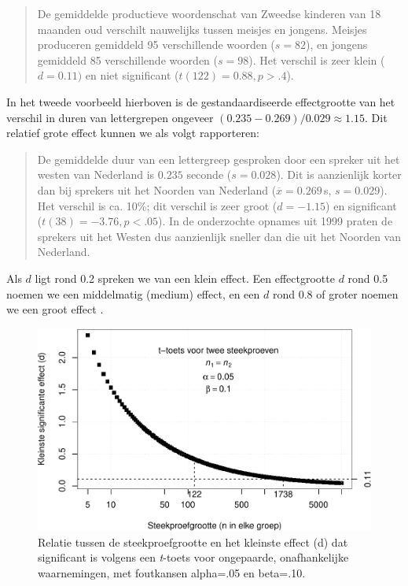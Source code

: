 \documentclass[
]{book}
\begin{document}
\begin{quote}
De gemiddelde productieve woordenschat van Zweedse kinderen van 18
maanden oud verschilt nauwelijks tussen meisjes en jongens. Meisjes
produceren gemiddeld 95 verschillende woorden (\(s=82\)), en jongens
gemiddeld 85 verschillende woorden (\(s=98\)). Het verschil is zeer
klein (\(d=0.11)\) en niet significant (\(t(122)=0.88, p>.4\)).
\end{quote}

In het tweede voorbeeld hierboven is de gestandaardiseerde effectgrootte
van het verschil in duren van lettergrepen ongeveer
\((0.235-0.269)/0.029 \approx 1.15\). Dit relatief grote effect kunnen we
als volgt rapporteren:

\begin{quote}
De gemiddelde duur van een lettergreep gesproken door een spreker uit
het westen van Nederland is \(0.235\) seconde (\(s=0.028\)). Dit is
aanzienlijk korter dan bij sprekers uit het Noorden van Nederland
(\(\overline{x}=0.269\) s, \(s=0.029\)). Het verschil is ca. 10\%; dit
verschil is zeer groot (\(d=-1.15\)) en significant
(\(t(38)=-3.76, p<.05\)). In de onderzochte opnames uit 1999 praten de
sprekers uit het Westen dus aanzienlijk sneller dan die uit het
Noorden van Nederland.
\end{quote}

Als \(d\) ligt rond 0.2 spreken we van een klein effect. Een effectgrootte
\(d\) rond 0.5 noemen we een middelmatig (medium) effect, en een \(d\) rond
0.8 of groter noemen we een groot effect \citep{Cohen88, Rose08}.

\begin{figure}
\centering
\includegraphics{KMS-NL_files/figure-latex/kleinstesignifverschil-1.pdf}
\caption{\label{fig:kleinstesignifverschil}Relatie tussen de steekproefgrootte en het kleinste effect (d) dat significant is volgens een \emph{t}-toets voor ongepaarde, onafhankelijke waarnemingen, met foutkansen alpha=.05 en beta=.10.}
\end{figure}
\end{document}
